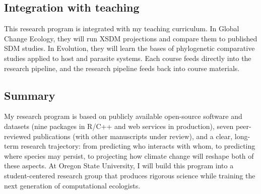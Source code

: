 \documentclass[11pt,letterpaper]{article}
\begin{document}
\subsection*{Integration with teaching}\label{integration-with-teaching}

This research program is integrated with my teaching curriculum. In Global Change Ecology, they will run XSDM projections and compare them to published SDM studies. In Evolution, they will learn the bases of phylogenetic comparative studies applied to host and parasite systems. Each course feeds directly into the research pipeline, and
the research pipeline feeds back into course materials. 

\subsection*{Summary}\label{summary}

My research program is based on publicly available open-source software and datasets (nine packages in R/C++ and web services in production), seven peer-reviewed publications (with other manuscripts under review), and a clear, long-term research trajectory: from predicting who interacts with whom, to predicting where species may persist, to projecting how climate change will reshape both of these aspects. At Oregon State University, I will build this program into a student-centered research group that produces rigorous science while training the next generation of computational ecologists.
\end{document}
